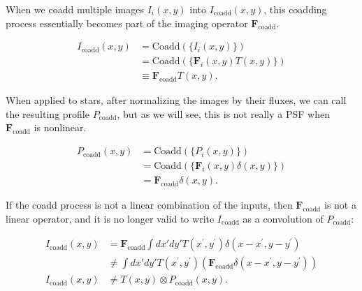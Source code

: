\documentclass{aastex63}
\begin{document}
When we coadd multiple images $I_i(x,y)$ into $I_\mathrm{coadd}(x,y)$, this coadding process
essentially becomes part of the imaging operator $\mathbf{F}_\mathrm{coadd}$.
\begin{linenomath}\begin{align}
    I_\mathrm{coadd}(x,y) &= \mathrm{Coadd} \left( \{ I_i(x,y) \} \right) \nonumber\\
    &= \mathrm{Coadd} \left( \{ \mathbf{F}_i(x,y) T(x,y) \} \right) \nonumber\\
    &\equiv \mathbf{F}_\mathrm{coadd} T(x,y).
\end{align}\end{linenomath}
When applied to stars, after normalizing the images by their fluxes,
we can call the resulting profile $P_\mathrm{coadd}$, but as we will see, this is
not really a PSF when $\mathbf{F}_\mathrm{coadd}$ is nonlinear.
\begin{linenomath}\begin{align}
    P_\mathrm{coadd}(x,y) &= \mathrm{Coadd} \left( \{ P_i(x,y) \} \right) \nonumber\\
    &= \mathrm{Coadd} \left( \{ \mathbf{F}_i(x,y) \delta(x,y) \} \right) \nonumber\\
    &= \mathbf{F}_\mathrm{coadd} \delta(x,y).
\end{align}\end{linenomath}
If the coadd process is not a linear combination of the inputs, 
then $\mathbf{F}_\mathrm{coadd}$ is not a linear operator, and it is no longer valid to
write $I_\mathrm{coadd}$ as a convolution of $P_\mathrm{coadd}$:
\begin{linenomath}\begin{align}
    I_\mathrm{coadd}(x,y) &= \mathbf{F}_\mathrm{coadd} \int dx' dy' T(x^\prime,y^\prime) \delta(x-x^\prime,y-y^\prime) \nonumber\\
    &\ne \int dx' dy' T(x^\prime,y^\prime) \left( \mathbf{F}_\mathrm{coadd} \delta(x-x^\prime,y-y^\prime) \right) \nonumber\\
    I_\mathrm{coadd}(x,y) &\ne T(x,y) \otimes P_\mathrm{coadd}(x,y).
\end{align}\end{linenomath}
\end{document}
